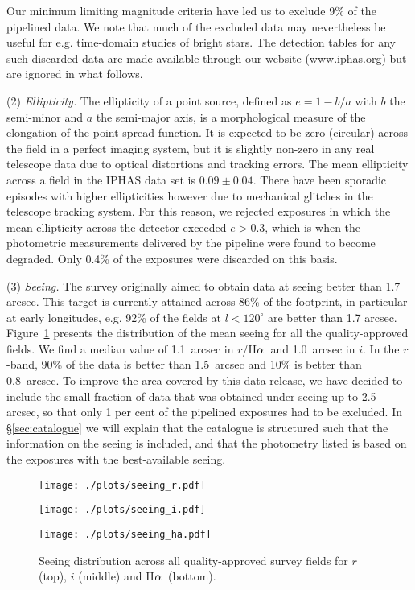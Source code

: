 \documentclass[useAMS,usenatbib]{mn2e}
\def\ha{\mbox{H$\rm \alpha$}}
\begin{document}
Our minimum limiting magnitude criteria
have led us to exclude 9\% of the pipelined data.
We note that much of the excluded data may nevertheless be useful
for e.g. time-domain studies of bright stars.
The detection tables for any such discarded data are made
available through our website (www.iphas.org)
but are ignored in what follows.

(2) \emph{Ellipticity.} 
The ellipticity of a point source,
defined as $e = 1 - b / a$ 
with $b$ the semi-minor and $a$ the semi-major axis,
is a morphological measure of the elongation of the point spread function.
It is expected to be zero (circular) across the field 
in a perfect imaging system,
but it is slightly non-zero in any real telescope data 
due to optical distortions and tracking errors.
The mean ellipticity across a field in the IPHAS data set 
is $0.09\pm0.04$.
There have been sporadic episodes with higher ellipticities however
due to mechanical glitches in the telescope tracking system.
For this reason, we rejected exposures in which the mean ellipticity
across the detector exceeded $e > 0.3$,
which is when the photometric measurements delivered by the pipeline
were found to become degraded.
Only 0.4\% of the exposures were discarded on this basis.

(3) \emph{Seeing.} 
The survey originally aimed to obtain data 
at seeing better than 1.7 arcsec.
This target is currently attained across 86\% of the footprint,
in particular at early longitudes,
e.g. 92\% of the fields at $l<120^\circ$ are better than 1.7 arcsec.
Figure~\ref{fig:seeing} presents the distribution
of the mean seeing for all the quality-approved fields.
We find a median value of 1.1~arcsec in $r$/\ha\
and 1.0~arcsec in $i$.
In the $r$-band, 90\% of the data is better than 1.5~arcsec
and 10\% is better than 0.8~arcsec.
To improve the area covered by this data release,
we have decided to include the small fraction of data
that was obtained under seeing up to 2.5 arcsec,
so that only 1 per cent of the pipelined exposures
had to be excluded.
In \S\ref{sec:catalogue} we will explain
that the catalogue is structured
such that the information on the seeing is included,
and that the photometry listed
is based on the exposures with the best-available seeing.

\begin{figure}
    \begin{minipage}[b]{\linewidth}
        \texttt{[image: ./plots/seeing\_r.pdf]} 
    \end{minipage}
    \begin{minipage}[b]{\linewidth}
        \texttt{[image: ./plots/seeing\_i.pdf]} 
    \end{minipage}
    \begin{minipage}[b]{\linewidth}
        \texttt{[image: ./plots/seeing\_ha.pdf]} 
    \end{minipage}
    \caption{Seeing distribution across all
             quality-approved survey fields
             for $r$ (top), $i$ (middle) and \ha\ (bottom).}
    \label{fig:seeing}
\end{figure}
\end{document}
